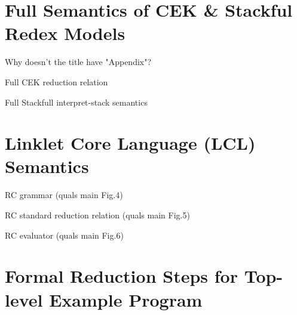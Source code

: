 \begin{appendices}



\chapter[\texorpdfstring{Full Semantics of CEK \& Stackful Redex Models}
                          {Appendix A}]{Full Semantics of CEK \& Stackful Redex Models}
\label{appendix:cek-stackful-redex}

    \begin{todo}
        Why doesn't the title have "Appendix"?
    \end{todo}

    \begin{figure-here}
        Full CEK reduction relation
    \end{figure-here}

    \begin{figure-here}
        Full Stackfull interpret-stack semantics
    \end{figure-here}

\chapter[\texorpdfstring{Linklet Kernel Language (LKL) Semantics}{Appendix B}]{Linklet Core Language (LCL) Semantics}
\label{appendix:linklet-kernel-language}

    \begin{figure-here}
        RC grammar (quals main Fig.4)
    \end{figure-here}

    \begin{figure-here}
        RC standard reduction relation (quals main Fig.5)
    \end{figure-here}

    \begin{figure-here}
        RC evaluator (quals main Fig.6)
    \end{figure-here}


\chapter[\texorpdfstring{Formal Reduction Steps for Top-level Example Program}{Appendix C}]{Formal Reduction Steps for Top-level Example Program}
\label{appendix:formal-reduction-steps-toplevel-example}


\end{appendices}

